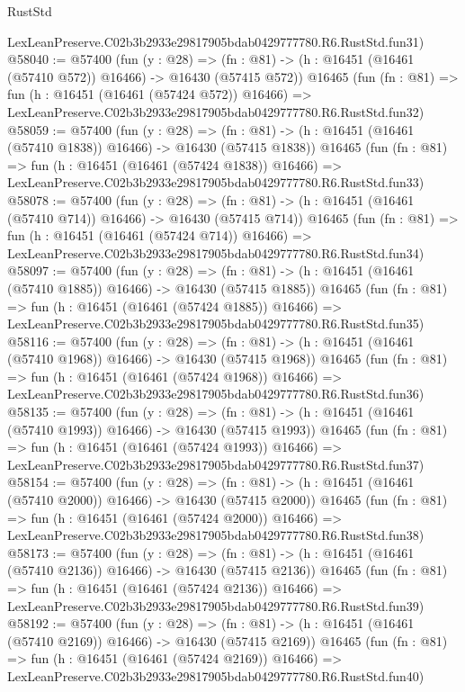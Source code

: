 \begin{lexlean}{RustStd}
\begin{coremodule}
    LexLeanPreserve.C02b3b2933e29817905bdab0429777780.R6.RustStd.fun31)
@58040 := @57400
    (fun (y : @28) =>
    (fn : @81) -> (h : @16451 (@16461 (@57410 @572)) @16466) -> @16430 (@57415 @572))
    @16465
    (fun (fn : @81) =>
    fun (h : @16451 (@16461 (@57424 @572)) @16466) =>
    LexLeanPreserve.C02b3b2933e29817905bdab0429777780.R6.RustStd.fun32)
@58059 := @57400
    (fun (y : @28) =>
    (fn : @81) -> (h : @16451 (@16461 (@57410 @1838)) @16466) -> @16430 (@57415 @1838))
    @16465
    (fun (fn : @81) =>
    fun (h : @16451 (@16461 (@57424 @1838)) @16466) =>
    LexLeanPreserve.C02b3b2933e29817905bdab0429777780.R6.RustStd.fun33)
@58078 := @57400
    (fun (y : @28) =>
    (fn : @81) -> (h : @16451 (@16461 (@57410 @714)) @16466) -> @16430 (@57415 @714))
    @16465
    (fun (fn : @81) =>
    fun (h : @16451 (@16461 (@57424 @714)) @16466) =>
    LexLeanPreserve.C02b3b2933e29817905bdab0429777780.R6.RustStd.fun34)
@58097 := @57400
    (fun (y : @28) =>
    (fn : @81) -> (h : @16451 (@16461 (@57410 @1885)) @16466) -> @16430 (@57415 @1885))
    @16465
    (fun (fn : @81) =>
    fun (h : @16451 (@16461 (@57424 @1885)) @16466) =>
    LexLeanPreserve.C02b3b2933e29817905bdab0429777780.R6.RustStd.fun35)
@58116 := @57400
    (fun (y : @28) =>
    (fn : @81) -> (h : @16451 (@16461 (@57410 @1968)) @16466) -> @16430 (@57415 @1968))
    @16465
    (fun (fn : @81) =>
    fun (h : @16451 (@16461 (@57424 @1968)) @16466) =>
    LexLeanPreserve.C02b3b2933e29817905bdab0429777780.R6.RustStd.fun36)
@58135 := @57400
    (fun (y : @28) =>
    (fn : @81) -> (h : @16451 (@16461 (@57410 @1993)) @16466) -> @16430 (@57415 @1993))
    @16465
    (fun (fn : @81) =>
    fun (h : @16451 (@16461 (@57424 @1993)) @16466) =>
    LexLeanPreserve.C02b3b2933e29817905bdab0429777780.R6.RustStd.fun37)
@58154 := @57400
    (fun (y : @28) =>
    (fn : @81) -> (h : @16451 (@16461 (@57410 @2000)) @16466) -> @16430 (@57415 @2000))
    @16465
    (fun (fn : @81) =>
    fun (h : @16451 (@16461 (@57424 @2000)) @16466) =>
    LexLeanPreserve.C02b3b2933e29817905bdab0429777780.R6.RustStd.fun38)
@58173 := @57400
    (fun (y : @28) =>
    (fn : @81) -> (h : @16451 (@16461 (@57410 @2136)) @16466) -> @16430 (@57415 @2136))
    @16465
    (fun (fn : @81) =>
    fun (h : @16451 (@16461 (@57424 @2136)) @16466) =>
    LexLeanPreserve.C02b3b2933e29817905bdab0429777780.R6.RustStd.fun39)
@58192 := @57400
    (fun (y : @28) =>
    (fn : @81) -> (h : @16451 (@16461 (@57410 @2169)) @16466) -> @16430 (@57415 @2169))
    @16465
    (fun (fn : @81) =>
    fun (h : @16451 (@16461 (@57424 @2169)) @16466) =>
    LexLeanPreserve.C02b3b2933e29817905bdab0429777780.R6.RustStd.fun40)

\end{coremodule}
\end{lexlean}
